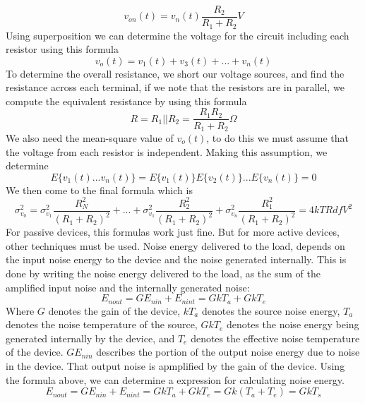 \documentclass[12pt]{article}
\begin{document}
\begin{equation}
    v_{on}(t) = v_n (t) \frac{R_2}{R_1 + R_2} V
\end{equation}
Using superposition we can determine the voltage for the circuit including each resistor using this formula
\begin{equation}
    v_{o} (t) = v_1 (t) + v_3 (t) + ... + v_n (t) 
\end{equation}
To determine the overall resistance, we short our voltage sources, and find the resistance across each terminal, if we note that the resistors are in parallel, we compute the equivalent resistance by using this formula
\begin{equation}
    R = R_1 || R_2 = \frac{R_1 R_2}{R_1 + R_2} \Omega
\end{equation}
We also need the mean-square value of $v_o (t)$, to do this we must assume that the voltage from each resistor is independent. Making this assumption, we determine 
\begin{equation}
    E \{v_1 (t) ... v_n(t) \} = E\{ v_1(t)\}E\{ v_2(t)\} ... E\{ v_n(t)\} = 0
\end{equation}
We then come to the final formula which is 
\begin{equation}
    \sigma_{v_0}^{2} = \sigma_{v_1}^{2} \frac{R_N^2}{(R_1 + R_2)^2} + ... + \sigma_{v_1}^{2} \frac{R_2^2}{(R_1 + R_2)^2} + \sigma_{v_n}^{2} \frac{R_1^2}{(R_1 + R_2)^2} = 4kTRdf V^2
\end{equation}
For passive devices, this formulas work just fine. But for more active devices, other techniques must be used. Noise energy delivered to the load, depends on the input noise energy to the device and the noise generated internally. This is done by writing the noise energy delivered to the load, as the sum of the amplified input noise and the internally generated noise:
\begin{equation}
    E_{nout} = GE_{nin} + E_{nint} = GkT_a + GkT_e
\end{equation}
Where $G$ denotes the gain of the device, $kT_a$ denotes the source noise energy, $T_a$ denotes the noise temperature of the source, $GkT_e$ denotes the noise energy being generated internally by the device, and $T_e$ denotes the effective noise temperature of the device. $GE_{nin}$ describes the portion of the output noise energy due to noise in the device. That output noise is apmplified by the gain of the device. Using the formula above, we can determine a expression for calculating noise energy.
\begin{equation}
    E_{nout} = GE_{nin} + E_{nint} = GkT_a + GkT_e = Gk(T_a + T_e) = GkT_s
\end{equation}
\end{document}
